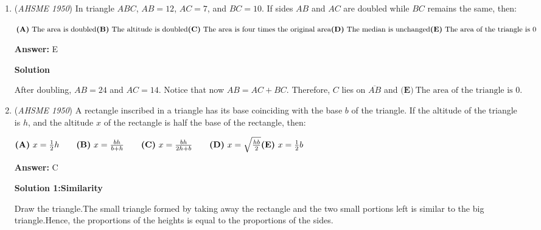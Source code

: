 \begin{enumerate}
 



\textbf{Solution 3}

It is well-known that an $n$-gon has $\frac{n(n-3)}{2}$ diagonals. Therefore, the $100$-gon has $\frac{100\cdot 97}{2} = \boxed{\textbf{(A)}\ 4850 }$ diagonals.

 -\href{https://artofproblemsolving.com/wiki/index.php/User:Cxsmi}{cxsmi}, edited by j314andrews

 


	\item (\textit{AHSME 1950}) In triangle $ABC$, $AB=12$, $AC=7$, and $BC=10$. If sides $AB$ and $AC$ are doubled while $BC$ remains the same, then:


 $\textbf{(A)}\ \text{The area is doubled}\qquad\\ \textbf{(B)}\ \text{The altitude is doubled}\qquad\\ \textbf{(C)}\ \text{The area is four times the original area}\qquad\\ \textbf{(D)}\ \text{The median is unchanged}\qquad\\ \textbf{(E)}\ \text{The area of the triangle is 0}$

 \textbf{Answer: }E



\textbf{Solution}

After doubling, $AB = 24$ and $AC= 14$.  Notice that now $AB = AC + BC$. Therefore, $C$ lies on $\overline{AB}$ and $\boxed{\textbf{(E)}\ \text{The area of the triangle is 0}}$.

 


	\item (\textit{AHSME 1950}) A rectangle inscribed in a triangle has its base coinciding with the base $b$ of the triangle. If the altitude of the triangle is $h$, and the altitude $x$ of the rectangle is half the base of the rectangle, then:


 $\textbf{(A)}\ x=\frac{1}{2}h\qquad\textbf{(B)}\ x=\frac{bh}{b+h}\qquad\textbf{(C)}\ x=\frac{bh}{2h+b}\qquad\textbf{(D)}\ x=\sqrt{\frac{hb}{2}}\qquad\\ \textbf{(E)}\ x=\frac{1}{2}b$

 \textbf{Answer: }C



\textbf{Solution 1:Similarity}

Draw the triangle.The small triangle formed by taking away the rectangle and the two small portions left is similar to the big triangle.Hence, the proportions of the heights is equal to the proportions of the sides. 


\end{enumerate}
